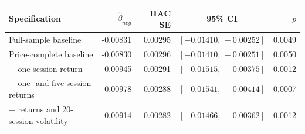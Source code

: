 \setlength{\tabcolsep}{5pt}
\begin{tabular}{@{}l d{-1.5} d{1.5} c d{1.4}@{}}
\toprule
Specification & {$\hat\beta_{neg}$} & {HAC SE} & {95\% CI} & {$p$} \\
\midrule
Full-sample baseline & -0.00831 & 0.00295 & $[-0.01410,\,-0.00252]$ & 0.0049 \\
Price-complete baseline & -0.00830 & 0.00296 & $[-0.01410,\,-0.00251]$ & 0.0050 \\
+ one-session return & -0.00945 & 0.00291 & $[-0.01515,\,-0.00375]$ & 0.0012 \\
+ one- and five-session returns & -0.00978 & 0.00288 & $[-0.01541,\,-0.00414]$ & 0.0007 \\
+ returns and 20-session volatility & -0.00914 & 0.00282 & $[-0.01466,\,-0.00362]$ & 0.0012 \\
\bottomrule
\end{tabular}
